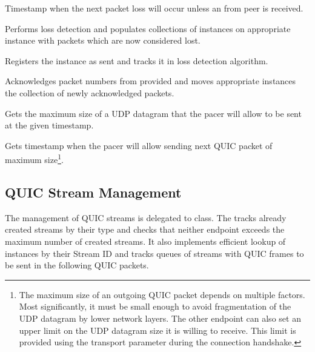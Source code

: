 \begin{description}

       Timestamp when the next packet
loss will occur unless an \ACK{} from peer is received.

       Performs loss detection and populates
collections of \SentPacket{} instances on appropriate \PacketNumberSpace{} instance with packets
which are now considered lost.

       Registers the
\SentPacket{} instance as sent and tracks it in loss detection algorithm.

       Acknowledges
packet numbers from provided \RangeSet{} and moves appropriate \SentPacket{} instances the
collection of newly acknowledged packets.

       Gets the maximum size of a UDP
datagram that the pacer will allow to be sent at the given timestamp.

         Gets timestamp when the
pacer will allow sending next QUIC packet of maximum size\footnote{The maximum size of an outgoing
QUIC packet depends on multiple factors. Most significantly, it must be small enough to avoid
fragmentation of the UDP datagram by lower network layers. The other endpoint can also set an upper
limit on the UDP datagram size it is willing to receive. This limit is provided using the
\MaxUdpPayloadSize{} transport parameter during the connection handshake.}.

\end{description}

\subsection{QUIC Stream Management}

The management of QUIC streams is delegated to \StreamCollection{} class. The \StreamCollection{}
tracks already created streams by their type and checks that neither endpoint exceeds the maximum
number of created streams. It also implements efficient lookup of \ManagedQuicStream{} instances by
their Stream ID and tracks queues of streams with QUIC frames to be sent in the following QUIC
packets.

